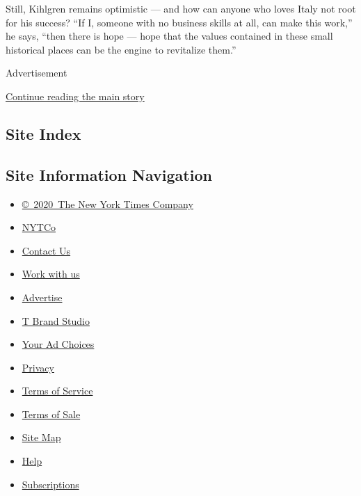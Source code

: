 Still, Kihlgren remains optimistic --- and how can anyone who loves
Italy not root for his success? ``If I, someone with no business skills
at all, can make this work,'' he says, ``then there is hope --- hope
that the values contained in these small historical places can be the
engine to revitalize them.''

Advertisement

\protect\hyperlink{after-bottom}{Continue reading the main story}

\hypertarget{site-index}{%
\subsection{Site Index}\label{site-index}}

\hypertarget{site-information-navigation}{%
\subsection{Site Information
Navigation}\label{site-information-navigation}}

\begin{itemize}
\tightlist
\item
  \href{https://help.nytimes3xbfgragh.onion/hc/en-us/articles/115014792127-Copyright-notice}{©~2020~The
  New York Times Company}
\end{itemize}

\begin{itemize}
\tightlist
\item
  \href{https://www.nytco.com/}{NYTCo}
\item
  \href{https://help.nytimes3xbfgragh.onion/hc/en-us/articles/115015385887-Contact-Us}{Contact
  Us}
\item
  \href{https://www.nytco.com/careers/}{Work with us}
\item
  \href{https://nytmediakit.com/}{Advertise}
\item
  \href{http://www.tbrandstudio.com/}{T Brand Studio}
\item
  \href{https://www.nytimes3xbfgragh.onion/privacy/cookie-policy\#how-do-i-manage-trackers}{Your
  Ad Choices}
\item
  \href{https://www.nytimes3xbfgragh.onion/privacy}{Privacy}
\item
  \href{https://help.nytimes3xbfgragh.onion/hc/en-us/articles/115014893428-Terms-of-service}{Terms
  of Service}
\item
  \href{https://help.nytimes3xbfgragh.onion/hc/en-us/articles/115014893968-Terms-of-sale}{Terms
  of Sale}
\item
  \href{https://spiderbites.nytimes3xbfgragh.onion}{Site Map}
\item
  \href{https://help.nytimes3xbfgragh.onion/hc/en-us}{Help}
\item
  \href{https://www.nytimes3xbfgragh.onion/subscription?campaignId=37WXW}{Subscriptions}
\end{itemize}
